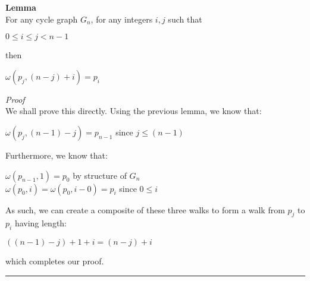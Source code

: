 \documentclass[a4paper,12pt]{article}
\begin{document}
\begin{tcolorbox}
\textbf{Lemma}\\
For any cycle graph $G_n$, for any integers $i, j$ such that
\begin{center}
$0 \leq i \leq j < n - 1$
\end{center}
then
\begin{center}
$\omega(p_j, (n - j) + i) = p_i$
\end{center}
\end{tcolorbox}
\noindent
\textit{Proof}\\
We shall prove this directly. Using the previous lemma, we know that:
\begin{center}
$\omega(p_j, (n - 1) - j) = p_{n-1}$ since $j \leq (n - 1)$
\end{center}
Furthermore, we know that:
\begin{center}
$\omega(p_{n-1}, 1) = p_0$ by structure of $G_n$\\
$\omega(p_0, i) = \omega(p_0, i - 0) = p_i$ since $0 \leq i$
\end{center}
As such, we can create a composite of these three walks to form a walk from $p_j$ to $p_i$ having length:
\begin{center}
$((n - 1) - j) + 1 + i = (n - j) + i$
\end{center}
which completes our proof.
\begin{center}
\noindent\rule{8cm}{0.4pt}
\end{center}
\end{document}
